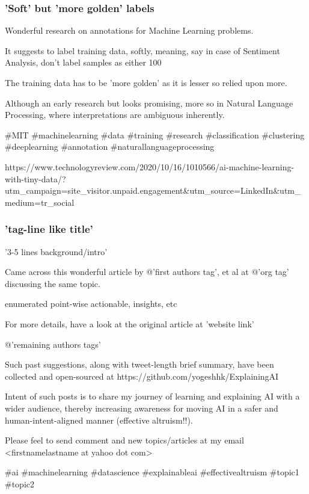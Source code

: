\begin{frame}[fragile]\frametitle{'Soft' but 'more golden' labels}

Wonderful research on annotations for Machine Learning problems.

It suggests to label training data, softly, meaning, say in case of Sentiment Analysis, don't label samples as either 100%

The training data has to be 'more golden' as it is lesser so relied upon more.

Although an early research but looks promising, more so in Natural Language Processing, where interpretations are ambiguous inherently.

\#MIT \#machinelearning \#data \#training \#research \#classification \#clustering \#deeplearning \#annotation \#naturallanguageprocessing

https://www.technologyreview.com/2020/10/16/1010566/ai-machine-learning-with-tiny-data/?utm\_campaign=site\_visitor.unpaid.engagement\&utm\_source=LinkedIn\&utm\_medium=tr\_social

\end{frame}



\begin{frame}[fragile]\frametitle{'tag-line like title'}

'3-5 lines background/intro'

Came across this wonderful article by @'first authors tag', et al at @'org tag' discussing the same topic.

enumerated point-wise actionable, insights, etc

For more details, have a look at the original article at 'website link'

@'remaining authors tags'

Such past suggestions, along with tweet-length brief summary, have been collected and open-sourced at https://github.com/yogeshhk/ExplainingAI

Intent of such posts is to share my journey of learning and explaining AI with a wider audience, thereby increasing awareness for moving AI in a safer and human-intent-aligned manner (effective altruism!!).

Please feel to send comment and new topics/articles at my email <firstnamelastname at yahoo dot com>

\#ai \#machinelearning \#datascience \#explainableai \#effectivealtruism \#topic1 \#topic2

\end{frame}